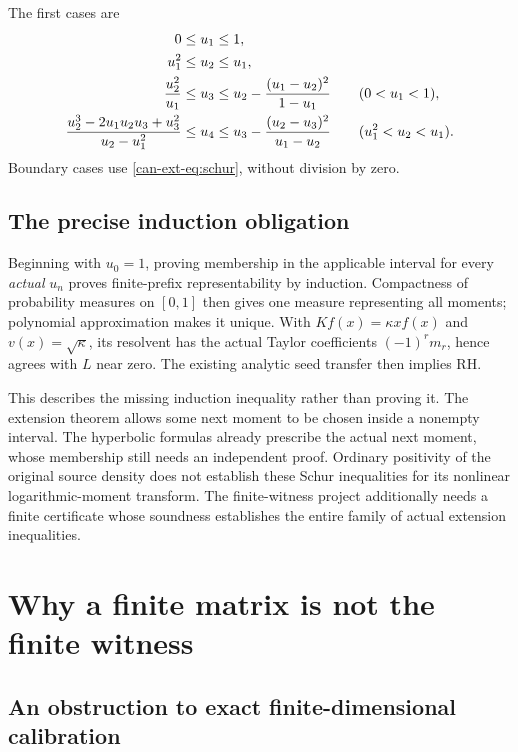 \documentclass[11pt,a4paper]{article}
\numberwithin{equation}{section}
\theoremstyle{definition}
\theoremstyle{remark}
\begin{document}
The first cases are
\begin{align}
 0&\leq u_1\leq1,\notag\\
 u_1^2&\leq u_2\leq u_1,\notag\\
 \frac{u_2^2}{u_1}&\leq u_3\leq
 u_2-\frac{(u_1-u_2)^2}{1-u_1}\qquad(0<u_1<1),
 \label{can-ext-eq:first-intervals}\\
 \frac{u_2^3-2u_1u_2u_3+u_3^2}{u_2-u_1^2}
 &\leq u_4\leq
 u_3-\frac{(u_2-u_3)^2}{u_1-u_2}\qquad(u_1^2<u_2<u_1).
 \notag
\end{align}
Boundary cases use \eqref{can-ext-eq:schur}, without division by zero.

\subsection{The precise induction obligation}

Beginning with $u_0=1$, proving membership in the applicable interval
for every \emph{actual} $u_n$ proves finite-prefix representability
by induction. Compactness of probability measures on $[0,1]$ then
gives one measure representing all moments; polynomial approximation
makes it unique. With $Kf(x)=\kappa xf(x)$ and
$v(x)=\sqrt\kappa$, its resolvent has the actual Taylor coefficients
$(-1)^rm_r$, hence agrees with $L$ near zero. The existing analytic
seed transfer then implies RH.

This describes the missing induction inequality rather than proving it.
The extension theorem allows some next moment to be chosen inside a
nonempty interval. The hyperbolic formulas already prescribe the actual
next moment, whose membership still needs an independent proof.
Ordinary positivity of the original source density does not establish
these Schur inequalities for its nonlinear logarithmic-moment transform.
The finite-witness project additionally needs a finite certificate whose
soundness establishes the entire family of actual extension inequalities.


\section[Finite matrices and witnesses]{Why a finite matrix is not the finite witness}\label{sec:finite}

\subsection{An obstruction to exact finite-dimensional calibration}
\end{document}
